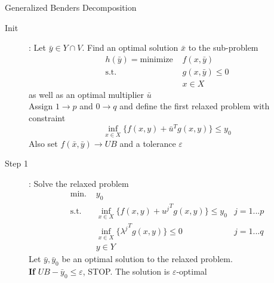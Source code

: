 \begin{algorithm}[h!]
    \caption{Generalized Benders Decomposition}
    \label{alg:generalized_benders}
    \begin{description}
        \item[Init] : Let $\bar y\in Y\cap V$. Find an optimal solution $\bar x$ to the sub-problem \begin{align*}
            h(\bar y) = 
            \textrm{minimize } & f(x, \bar y)\\
            \textrm{s.t. } & g(x, \bar y) \le 0\\
            & x\in X
        \end{align*} as well as an optimal multiplier $\bar u$\\
        Assign $1\rightarrow p$ and $0\rightarrow q$ and define the first relaxed problem with constraint \[ \inf_{x\in X}\{ f(x,y) + \bar u^T g(x,y) \} \le y_0 \] Also set $f(\bar x, \bar y)\rightarrow UB$ and a tolerance $\varepsilon$
        \item[Step 1] : Solve the relaxed problem 
        \begin{align*}
            \textrm{min. } & y_0\\
            \textrm{s.t. } & \inf_{x\in X}\{ f(x,y) + {u^j}^Tg(x,y) \} \le y_0 & j = 1...p\\
            & \inf_{x\in X}\{ {\lambda^j}^Tg(x,y) \} \le 0 & j = 1...q\\
            & y\in Y
        \end{align*}
        Let $\bar y,\bar y_0$ be an optimal solution to the relaxed problem. \\
        \textbf{If} $UB - \bar y_0 \le \varepsilon$, STOP. The solution is $\varepsilon$-optimal
    \end{description}
\end{algorithm}

